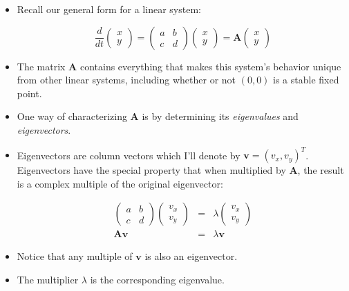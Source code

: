 \documentclass{article}
\begin{document}
\begin{itemize}

\item Recall our general form for a linear system:

\[ \frac{d}{dt} \begin{pmatrix} x\\y \end{pmatrix} = \begin{pmatrix} a & b\\ c & d\end{pmatrix} \begin{pmatrix} x\\ y \end{pmatrix} = \mathbf{A} \begin{pmatrix} x\\ y \end{pmatrix} \]

\item The matrix $\mathbf{A}$ contains everything that makes this system's behavior unique from other linear systems, including whether or not $(0,0)$ is a stable fixed point.

\item One way of characterizing $\mathbf{A}$ is by determining its \textit{eigenvalues} and \textit{eigenvectors}.

\item Eigenvectors are column vectors which I'll denote by $\mathbf{v} = (v_x, v_y)^T$. Eigenvectors have the special property that when multiplied by $\mathbf{A}$, the result is a complex multiple of the original eigenvector:

\begin{eqnarray*}
\begin{pmatrix} a & b\\ c & d\end{pmatrix} \begin{pmatrix} v_x\\ v_y \end{pmatrix} & = & \lambda \begin{pmatrix} v_x\\ v_y \end{pmatrix}\\
\mathbf{A} \mathbf{v} & = & \lambda \mathbf{v}
\end{eqnarray*}

\item Notice that any multiple of $\mathbf{v}$ is also an eigenvector.

\item The multiplier $\lambda$ is the corresponding eigenvalue.


\end{itemize}
\end{document}
